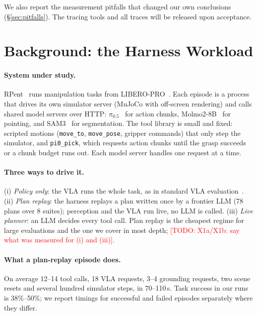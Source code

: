 \documentclass[conference,10pt]{IEEEtran}
\newcommand{\pct}[1]{#1\%}
\newcommand{\num}[1]{#1}                        %
\newcommand{\todo}[1]{\textcolor{red}{[TODO: #1]}}
\begin{document}
We also report the measurement pitfalls that changed our own conclusions
(\S\ref{sec:pitfalls}). The tracing tools and all traces will be released upon acceptance.

\section{Background: the Harness Workload}\label{sec:background}

\paragraph{System under study.} RPent~\cite{rpent} runs manipulation tasks from
LIBERO-PRO~\cite{liberopro}. Each episode is a process that drives its own simulator server
(MuJoCo with off-screen rendering) and calls shared model servers over HTTP:
$\pi_{0.5}$~\cite{pi05} for action chunks, Molmo2-8B~\cite{molmo2} for pointing, and
SAM3~\cite{sam3} for segmentation. The tool library is small and fixed: scripted motions
(\texttt{move\_to}, \texttt{move\_pose}, gripper commands) that only step the simulator, and
\texttt{pi0\_pick}, which requests action chunks until the grasp succeeds or a chunk budget
runs out. Each model server handles one request at a time.

\paragraph{Three ways to drive it.} (i) \emph{Policy only}: the VLA runs the whole task, as
in standard VLA evaluation~\cite{vlaeval}. (ii) \emph{Plan replay}: the harness replays a
plan written once by a frontier LLM (78 plans over 8 suites); perception and the VLA run
live, no LLM is called. (iii) \emph{Live planner}: an LLM decides every tool call.
Plan replay is the cheapest regime for large evaluations and the one we cover in most depth;
\todo{X1a/X1b: say what was measured for (i) and (iii)}.

\paragraph{What a plan-replay episode does.} On average \num{12}--\num{14} tool calls,
\num{18} VLA requests, \num{3}--\num{4} grounding requests, two scene resets and several
hundred simulator steps, in 70--110\,s. Task success in our runs is \pct{38}--\pct{50};
we report timings for successful and failed episodes separately where they differ.
\end{document}
